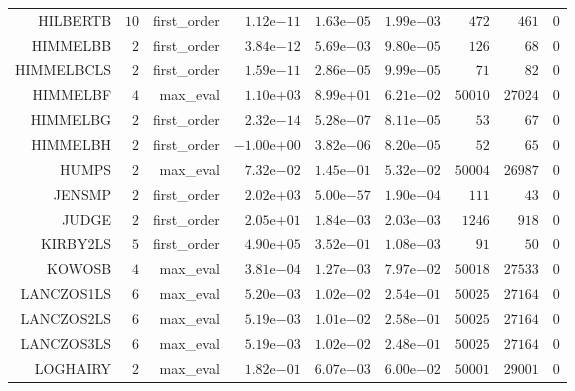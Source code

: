 \begin{longtable}{rrrrrrrrr}
HILBERTB & \(    10\) & first\_order & \( 1.12\)e\(-11\) & \( 1.63\)e\(-05\) & \( 1.99\)e\(-03\) & \(   472\) & \(   461\) & \(     0\) \\
HIMMELBB & \(     2\) & first\_order & \( 3.84\)e\(-12\) & \( 5.69\)e\(-03\) & \( 9.80\)e\(-05\) & \(   126\) & \(    68\) & \(     0\) \\
HIMMELBCLS & \(     2\) & first\_order & \( 1.59\)e\(-11\) & \( 2.86\)e\(-05\) & \( 9.99\)e\(-05\) & \(    71\) & \(    82\) & \(     0\) \\
HIMMELBF & \(     4\) & max\_eval & \( 1.10\)e\(+03\) & \( 8.99\)e\(+01\) & \( 6.21\)e\(-02\) & \( 50010\) & \( 27024\) & \(     0\) \\
HIMMELBG & \(     2\) & first\_order & \( 2.32\)e\(-14\) & \( 5.28\)e\(-07\) & \( 8.11\)e\(-05\) & \(    53\) & \(    67\) & \(     0\) \\
HIMMELBH & \(     2\) & first\_order & \(-1.00\)e\(+00\) & \( 3.82\)e\(-06\) & \( 8.20\)e\(-05\) & \(    52\) & \(    65\) & \(     0\) \\
HUMPS & \(     2\) & max\_eval & \( 7.32\)e\(-02\) & \( 1.45\)e\(-01\) & \( 5.32\)e\(-02\) & \( 50004\) & \( 26987\) & \(     0\) \\
JENSMP & \(     2\) & first\_order & \( 2.02\)e\(+03\) & \( 5.00\)e\(-57\) & \( 1.90\)e\(-04\) & \(   111\) & \(    43\) & \(     0\) \\
JUDGE & \(     2\) & first\_order & \( 2.05\)e\(+01\) & \( 1.84\)e\(-03\) & \( 2.03\)e\(-03\) & \(  1246\) & \(   918\) & \(     0\) \\
KIRBY2LS & \(     5\) & first\_order & \( 4.90\)e\(+05\) & \( 3.52\)e\(-01\) & \( 1.08\)e\(-03\) & \(    91\) & \(    50\) & \(     0\) \\
KOWOSB & \(     4\) & max\_eval & \( 3.81\)e\(-04\) & \( 1.27\)e\(-03\) & \( 7.97\)e\(-02\) & \( 50018\) & \( 27533\) & \(     0\) \\
LANCZOS1LS & \(     6\) & max\_eval & \( 5.20\)e\(-03\) & \( 1.02\)e\(-02\) & \( 2.54\)e\(-01\) & \( 50025\) & \( 27164\) & \(     0\) \\
LANCZOS2LS & \(     6\) & max\_eval & \( 5.19\)e\(-03\) & \( 1.01\)e\(-02\) & \( 2.58\)e\(-01\) & \( 50025\) & \( 27164\) & \(     0\) \\
LANCZOS3LS & \(     6\) & max\_eval & \( 5.19\)e\(-03\) & \( 1.02\)e\(-02\) & \( 2.48\)e\(-01\) & \( 50025\) & \( 27164\) & \(     0\) \\
LOGHAIRY & \(     2\) & max\_eval & \( 1.82\)e\(-01\) & \( 6.07\)e\(-03\) & \( 6.00\)e\(-02\) & \( 50001\) & \( 29001\) & \(     0\) \\

\end{longtable}
